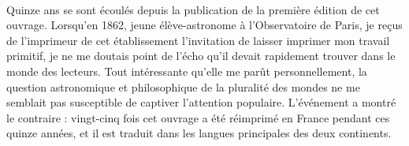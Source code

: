 \documentclass[a4paper, 11pt, oneside, landscape]{article}
\begin{document}
\paragraph{}
Quinze ans se sont écoulés depuis la publication de la première édition de cet ouvrage. Lorsqu'en 1862, jeune élève-astronome à l'Observatoire de Paris, je reçus de l'imprimeur de cet établissement l'invitation de laisser imprimer mon travail primitif, je ne me doutais point de l'écho qu'il devait rapidement trouver dans le monde des lecteurs. Tout intéressante qu'elle me parût personnellement, la question astronomique et philosophique de la pluralité des mondes ne me semblait pas susceptible de captiver l'attention populaire. L'événement a montré le contraire : vingt-cinq fois cet ouvrage a été réimprimé en France pendant ces quinze années, et il est traduit dans les langues principales des deux continents.
\end{document}
